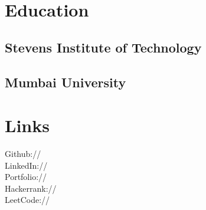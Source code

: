 \documentclass[]{deedy-resume-openfont}
\begin{document}
%
%

%
%



%
%

\begin{minipage}[t]{0.33\textwidth} 


\section{Education} 

\subsection{Stevens Institute of Technology}
\sectionsep

\subsection{Mumbai University}
\sectionsep



\section{Links} 
Github:// \href{https://github.com/Chinmay-395}{} \\
LinkedIn://  \href{https://www.linkedin.com/in/chinmay-395}{} \\
Portfolio:// \href{https://chinmay-dali-395.herokuapp.com/}{} \\
Hackerrank:// \href{https://www.hackerrank.com/chinmaydali395}{}  \\
LeetCode:// \href{https://leetcode.com/chinmaydali395/}{}  \\
\sectionsep




\end{minipage}
\end{document}
